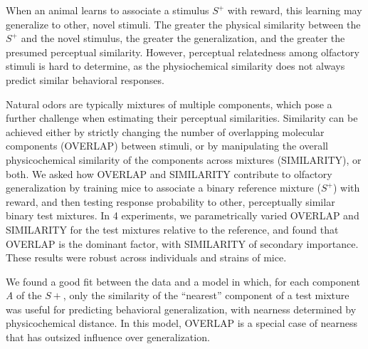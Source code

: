 When an animal learns to associate a stimulus $S^+$ with reward, this learning may generalize to other, novel stimuli. The greater the physical similarity between the $S^+$ and the novel stimulus, the greater the generalization, and the greater the presumed perceptual similarity. However, perceptual relatedness among olfactory stimuli is hard to determine, as the physiochemical similarity does not always predict similar behavioral responses.

Natural odors are typically mixtures of multiple components, which pose a further challenge when estimating their perceptual similarities.  Similarity can be achieved either by strictly changing the number of overlapping molecular components (OVERLAP) between stimuli, or by manipulating the overall physicochemical similarity of the components across mixtures (SIMILARITY), or both.  We asked how OVERLAP and SIMILARITY contribute to olfactory generalization by training mice to associate a binary reference mixture ($S^+$) with reward, and then testing response probability to other, perceptually similar binary test mixtures.  In 4 experiments, we parametrically varied OVERLAP and SIMILARITY for the test mixtures relative to the reference, and found that OVERLAP is the dominant factor, with SIMILARITY of secondary importance.  These results were robust across individuals and strains of mice.

We found a good fit between the data and a model in which, for each component \textit{A} of the $S+$, only the similarity of the ``nearest'' component  of a test mixture was useful for predicting behavioral generalization, with nearness determined by physicochemical distance.  In this model, OVERLAP is a special case of nearness that has outsized influence over generalization.  